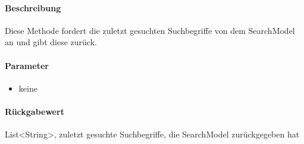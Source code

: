 \paragraph*{Beschreibung}
Diese Methode fordert die zuletzt gesuchten Suchbegriffe von dem SearchModel an und gibt diese zurück.
\paragraph*{Parameter}
\begin{itemize}
    \item keine
\end{itemize}
\paragraph*{Rückgabewert}
List<String>, zuletzt gesuchte Suchbegriffe, die SearchModel zurückgegeben hat